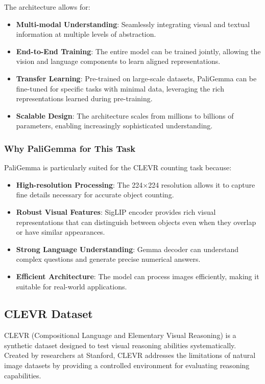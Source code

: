\documentclass[conference]{IEEEtran}
\begin{document}
The architecture allows for:
\begin{itemize}
    \item \textbf{Multi-modal Understanding}: Seamlessly integrating visual and textual information at multiple levels of abstraction.
    \item \textbf{End-to-End Training}: The entire model can be trained jointly, allowing the vision and language components to learn aligned representations.
    \item \textbf{Transfer Learning}: Pre-trained on large-scale datasets, PaliGemma can be fine-tuned for specific tasks with minimal data, leveraging the rich representations learned during pre-training.
    \item \textbf{Scalable Design}: The architecture scales from millions to billions of parameters, enabling increasingly sophisticated understanding.
\end{itemize}

\subsubsection{Why PaliGemma for This Task}

PaliGemma is particularly suited for the CLEVR counting task because:

\begin{itemize}
    \item \textbf{High-resolution Processing}: The 224×224 resolution allows it to capture fine details necessary for accurate object counting.
    \item \textbf{Robust Visual Features}: SigLIP encoder provides rich visual representations that can distinguish between objects even when they overlap or have similar appearances.
    \item \textbf{Strong Language Understanding}: Gemma decoder can understand complex questions and generate precise numerical answers.
    \item \textbf{Efficient Architecture}: The model can process images efficiently, making it suitable for real-world applications.
\end{itemize}

\subsection{CLEVR Dataset}

CLEVR (Compositional Language and Elementary Visual Reasoning) is a synthetic dataset designed to test visual reasoning abilities systematically. Created by researchers at Stanford, CLEVR addresses the limitations of natural image datasets by providing a controlled environment for evaluating reasoning capabilities.
\end{document}

